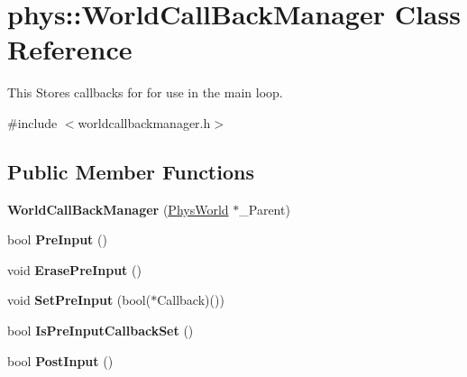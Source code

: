 \hypertarget{classphys_1_1WorldCallBackManager}{
\section{phys::WorldCallBackManager Class Reference}
\label{d8/d67/classphys_1_1WorldCallBackManager}
}


This Stores callbacks for for use in the main loop.  




{\ttfamily \#include $<$worldcallbackmanager.h$>$}

\subsection*{Public Member Functions}
\begin{DoxyCompactItemize}
\item 
\hypertarget{classphys_1_1WorldCallBackManager_a5d2c2274ebb06b799c8c73b087498f10}{
{\bfseries WorldCallBackManager} (\hyperlink{classPhysWorld}{PhysWorld} $\ast$\_\-Parent)}
\label{d8/d67/classphys_1_1WorldCallBackManager_a5d2c2274ebb06b799c8c73b087498f10}

\item 
\hypertarget{classphys_1_1WorldCallBackManager_a4419d5b03ab4d6dbaac62e44c93f3e78}{
bool {\bfseries PreInput} ()}
\label{d8/d67/classphys_1_1WorldCallBackManager_a4419d5b03ab4d6dbaac62e44c93f3e78}

\item 
\hypertarget{classphys_1_1WorldCallBackManager_a54d1c196022aca06cedb56623e94ea56}{
void {\bfseries ErasePreInput} ()}
\label{d8/d67/classphys_1_1WorldCallBackManager_a54d1c196022aca06cedb56623e94ea56}

\item 
\hypertarget{classphys_1_1WorldCallBackManager_a12e75fee657b3801d7f963bb40b4f0c1}{
void {\bfseries SetPreInput} (bool($\ast$Callback)())}
\label{d8/d67/classphys_1_1WorldCallBackManager_a12e75fee657b3801d7f963bb40b4f0c1}

\item 
\hypertarget{classphys_1_1WorldCallBackManager_a9664295282c3a1620214ed5610028c61}{
bool {\bfseries IsPreInputCallbackSet} ()}
\label{d8/d67/classphys_1_1WorldCallBackManager_a9664295282c3a1620214ed5610028c61}

\item 
\hypertarget{classphys_1_1WorldCallBackManager_a6f83ce01edfe33194cbe333c1d679b89}{
bool {\bfseries PostInput} ()}
\label{d8/d67/classphys_1_1WorldCallBackManager_a6f83ce01edfe33194cbe333c1d679b89}


\end{DoxyCompactItemize}
